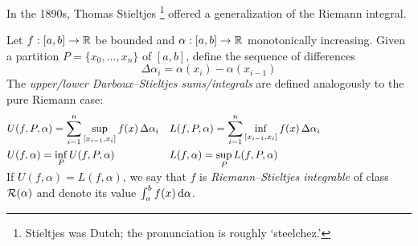 \begin{exercises}
\begin{enumerate}
	  
	  
	  
	
	\end{enumerate}
\end{exercises}



\clearpage




In the 1890s, Thomas Stieltjes \footnote{Stieltjes was Dutch; the pronunciation is roughly  `steelchez.'} offered a generalization of the Riemann integral.

\begin{defn}{}{}
	Let $f:[a,b]\to\mathbb{R}$ be bounded and $\alpha:[a,b]\to\mathbb{R}$ monotonically increasing. Given a partition $P=\{x_0,\ldots,x_n\}$ of $[a,b]$, define the sequence of differences
	\[
		\Delta\alpha_i=\alpha(x_i)-\alpha(x_{i-1})
	\]
	The \emph{upper/lower Darboux--Stieltjes sums/integrals} are defined analogously to the pure Riemann case:\vspace{-5pt}
	\begin{align*}
		&U(f,P,\alpha)=\sum_{i=1}^n \sup_{[x_{i-1},x_i]}f(x)\,\Delta\alpha_i
		&&L(f,P,\alpha)=\sum_{i=1}^n \inf_{[x_{i-1},x_i]}f(x)\,\Delta\alpha_i \hspace{3cm}\\
		&U(f,\alpha)=\smash[b]{\inf_P U(f,P,\alpha)}
		&&L(f,\alpha)=\smash[b]{\sup_P L(f,P,\alpha)}
	\end{align*}
	If $U(f,\alpha)=L(f,\alpha)$, we say that $f$ is \emph{Riemann--Stieltjes integrable} of class $\mathcal{R}(\alpha)$ and denote its value $\int_a^b f(x)\,\mathrm{d}\alpha$. 
\end{defn}

